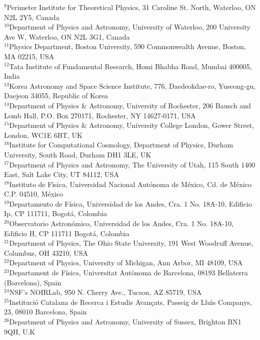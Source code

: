 {$^{9}$Perimeter Institute for Theoretical Physics, 31 Caroline St. North, Waterloo, ON N2L 2Y5, Canada\\ 
$^{10}$Department of Physics and Astronomy, University of Waterloo, 200 University Ave W, Waterloo, ON N2L 3G1, Canada\\ 
$^{11}$Physics Department, Boston University, 590 Commonwealth Avenue, Boston, MA 02215, USA\\ 
$^{12}$Tata Institute of Fundamental Research, Homi Bhabha Road, Mumbai 400005, India\\ 
$^{13}$Korea Astronomy and Space Science Institute, 776, Daedeokdae-ro, Yuseong-gu, Daejeon 34055, Republic of Korea\\ 
$^{14}$Department of Physics \& Astronomy, University of Rochester, 206 Bausch and Lomb Hall, P.O. Box 270171, Rochester, NY 14627-0171, USA\\ 
$^{15}$Department of Physics \& Astronomy, University College London, Gower Street, London, WC1E 6BT, UK\\ 
$^{16}$Institute for Computational Cosmology, Department of Physics, Durham University, South Road, Durham DH1 3LE, UK\\ 
$^{17}$Department of Physics and Astronomy, The University of Utah, 115 South 1400 East, Salt Lake City, UT 84112, USA\\ 
$^{18}$Instituto de F\'{\i}sica, Universidad Nacional Aut\'{o}noma de M\'{e}xico,  Cd. de M\'{e}xico  C.P. 04510,  M\'{e}xico\\ 
$^{19}$Departamento de F\'isica, Universidad de los Andes, Cra. 1 No. 18A-10, Edificio Ip, CP 111711, Bogot\'a, Colombia\\ 
$^{20}$Observatorio Astron\'omico, Universidad de los Andes, Cra. 1 No. 18A-10, Edificio H, CP 111711 Bogot\'a, Colombia\\ 
$^{21}$Department of Physics, The Ohio State University, 191 West Woodruff Avenue, Columbus, OH 43210, USA\\ 
$^{22}$Department of Physics, University of Michigan, Ann Arbor, MI 48109, USA\\
$^{23}$Departament de F\'{i}sica, Universitat Aut\`{o}noma de Barcelona, 08193 Bellaterra (Barcelona), Spain\\ 
$^{24}$NSF's NOIRLab, 950 N. Cherry Ave., Tucson, AZ 85719, USA\\ 
$^{25}$Instituci\'{o} Catalana de Recerca i Estudis Avan\c{c}ats, Passeig de Llu\'{\i}s Companys, 23, 08010 Barcelona, Spain\\ 
$^{26}$Department of Physics and Astronomy, University of Sussex, Brighton BN1 9QH, U.K\\ 
}
